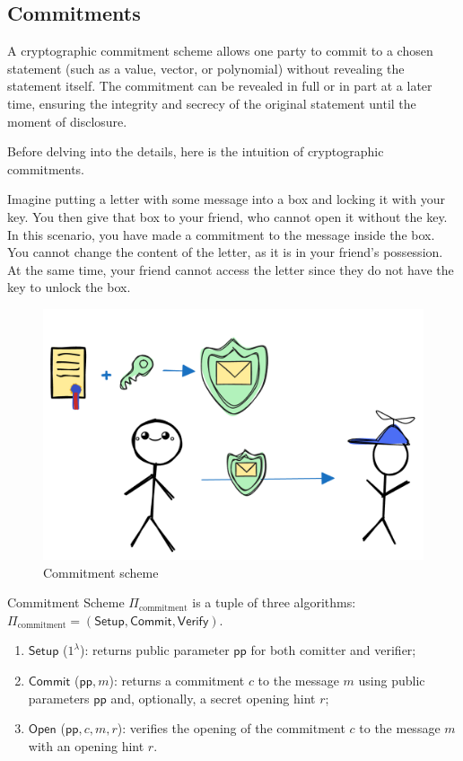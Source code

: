 \documentclass[../lecture-notes.tex]{subfiles}
\begin{document}
\subsection{Commitments}

\begin{definition}
    A cryptographic commitment scheme allows one party to commit to a chosen statement (such as a value, vector, or polynomial) without revealing the statement itself. The commitment can be revealed in full or in part at a later time, ensuring the integrity and secrecy of the original statement until the moment of disclosure.
\end{definition}

Before delving into the details, here is the intuition of cryptographic commitments.

Imagine putting a letter with some message into a box and locking it with your key. 
You then give that box to your friend, who cannot open it without the key.
In this scenario, you have made a commitment to the message inside the box. 
You cannot change the content of the letter, as it is in your friend's possession. 
At the same time, your friend cannot access the letter since they do not have the key to unlock the box.

\begin{figure}[H]
    \centering
    \includegraphics[width=0.5\linewidth, clip]{images/lecture_5/CommitmentExample.png}

    \caption{Commitment scheme}
\end{figure}

\begin{definition}
    
    Commitment Scheme $\Pi_{\text{commitment}}$ is a tuple of three algorithms: $\Pi_{\text{commitment}} = (\mathsf{Setup}, \mathsf{Commit}, \mathsf{Verify})$.

    \begin{enumerate}

        \item $\mathsf{Setup}$ ($1^{\lambda}$): returns public parameter $\mathsf{pp}$ for both comitter and verifier;

        \item  $\mathsf{Commit}$ ($\mathsf{pp}, m$): returns a commitment $c$ to the message $m$ using public parameters $\mathsf{pp}$ and, optionally, a secret opening hint $r$;

        \item  $\mathsf{Open}$ ($\mathsf{pp}, c, m, r$): verifies the opening of the commitment $c$ to the message $m$ with an opening hint $r$. 
    \end{enumerate}
\end{definition}
\end{document}
